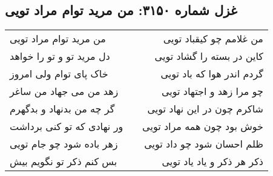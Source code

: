 \begin{center}
\section*{غزل شماره ۳۱۵۰: من مرید توام مراد تویی}
\label{sec:3150}
\begin{longtable}{l p{0.5cm} r}
من مرید توام مراد تویی
&&
من غلامم چو کیقباد تویی
\\
دل مرید تو و تو را خواهد
&&
کاین در بسته را گشاد تویی
\\
خاک پای توام ولی امروز
&&
گردم اندر هوا که باد تویی
\\
زهد من می جهاد من ساغر
&&
چو مرا زهد و اجتهاد تویی
\\
گر چه من بدنهاد و بدگهرم
&&
شاکرم چون در این نهاد تویی
\\
ور نهادی که تو کنی برداشت
&&
خوش بود چون همه مراد تویی
\\
زهر باده شود چو جام تویی
&&
ظلم احسان شود چو داد تویی
\\
بس کنم ذکر تو نگویم بیش
&&
ذکر هر ذکر و یاد یاد تویی
\\
\end{longtable}
\end{center}

